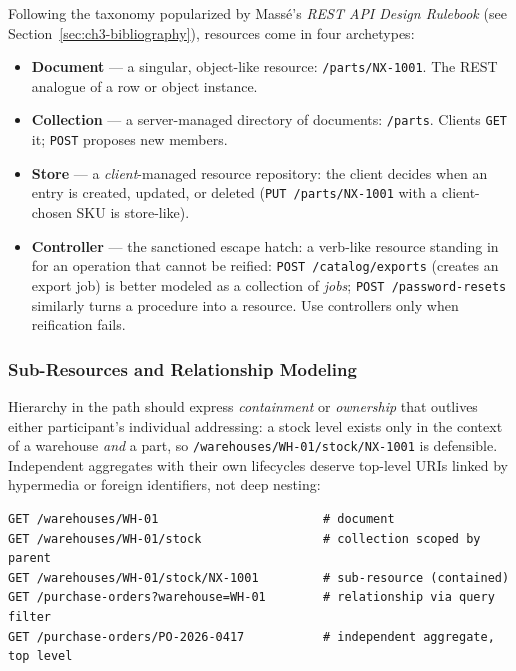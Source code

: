 Following the taxonomy popularized by Mass\'e's \emph{REST API Design Rulebook}
(see Section~\ref{sec:ch3-bibliography}), resources come in four archetypes:

\begin{itemize}
  \item \textbf{Document} --- a singular, object-like resource:
        \texttt{/parts/NX-1001}. The REST analogue of a row or object instance.
  \item \textbf{Collection} --- a server-managed directory of documents:
        \texttt{/parts}. Clients \texttt{GET} it; \texttt{POST} proposes new
        members.
  \item \textbf{Store} --- a \emph{client}-managed resource repository: the
        client decides when an entry is created, updated, or deleted
        (\texttt{PUT /parts/NX-1001} with a client-chosen SKU is store-like).
  \item \textbf{Controller} --- the sanctioned escape hatch: a verb-like resource
        standing in for an operation that cannot be reified:
        \texttt{POST /catalog/exports} (creates an export job) is better modeled
        as a collection of \emph{jobs}; \texttt{POST /password-resets} similarly
        turns a procedure into a resource. Use controllers only when reification
        fails.
\end{itemize}

\subsubsection{Sub-Resources and Relationship Modeling}

Hierarchy in the path should express \emph{containment} or \emph{ownership} that
outlives either participant's individual addressing: a stock level exists only in
the context of a warehouse \emph{and} a part, so
\texttt{/warehouses/WH-01/stock/NX-1001} is defensible. Independent aggregates
with their own lifecycles deserve top-level URIs linked by hypermedia or foreign
identifiers, not deep nesting:

\begin{verbatim}
GET /warehouses/WH-01                       # document
GET /warehouses/WH-01/stock                 # collection scoped by parent
GET /warehouses/WH-01/stock/NX-1001         # sub-resource (contained)
GET /purchase-orders?warehouse=WH-01        # relationship via query filter
GET /purchase-orders/PO-2026-0417           # independent aggregate, top level
\end{verbatim}

